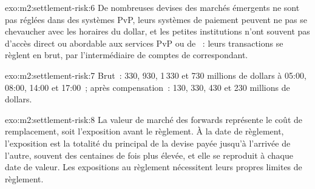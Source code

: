 \begin{solution}{exo:m2:settlement-risk:6}
De nombreuses devises des marchés émergents ne sont pas réglées dans des systèmes PvP, leurs systèmes de paiement
peuvent ne pas se chevaucher avec les horaires du dollar, et les petites institutions n'ont souvent
pas d'accès direct ou abordable aux services PvP ou de ~: leurs transactions se règlent
en brut, par l'intermédiaire de comptes de correspondant.
\end{solution}

\begin{solution}{exo:m2:settlement-risk:7}
Brut~: 330, 930, 1\,330 et 730 millions de dollars à 05:00, 08:00, 14:00 et 17:00~;
après compensation~: 130, 330, 430 et 230 millions de dollars.
\end{solution}

\begin{solution}{exo:m2:settlement-risk:8}
La valeur de marché des forwards représente le coût de remplacement, soit l'exposition avant
le règlement. À la date de règlement, l'exposition est la totalité du principal de la
devise payée jusqu'à l'arrivée de l'autre, souvent des centaines de fois plus élevée, et elle
se reproduit à chaque date de valeur. Les expositions au règlement nécessitent leurs propres limites de règlement.
\end{solution}

